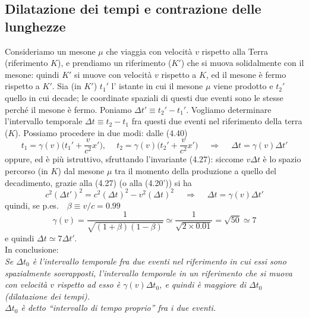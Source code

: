 \subsection{Dilatazione dei tempi e contrazione delle lunghezze}

Consideriamo un mesone $\mu$ che viaggia con velocit\`a $v$ rispetto alla Terra
(riferimento $K$), e prendiamo un riferimento ($K'$) che si muova solidalmente
con il mesone: quindi $K'$ si muove con velocit\`a $v$ rispetto a $K$, ed il
mesone \`e fermo rispetto a $K'$. Sia (in $K'$) $t_1'$ l' istante in cui il
mesone $\mu$ viene prodotto e $t_2'$ quello in cui decade; le coordinate
spaziali di questi due eventi sono le stesse perch\'e il mesone \`e fermo.
Poniamo $\Delta t'\equiv t_2'-t_1'$. Vogliamo determinare l'intervallo temporale
$\Delta t\equiv t_2-t_1$ fra questi due eventi nel riferimento della terra
($K$). Possiamo procedere in due modi: dalle (4.40)
\begin{equation}
  t_1=\gamma(v)\Big(t_1'+\frac{v}{c^2}x'\Big),
  \quad\ t_2=\gamma(v)\Big(t_2'+\frac{v}{c^2}x'\Big)
  \quad\ \Rightarrow\quad\ \Delta t=\gamma(v)\Delta t'
  \tag{4.42}
\end{equation}
oppure, ed \`e pi\`u istruttivo, sfruttando l'invariante (4.27): siccome
$v\Delta t$ \`e lo spazio percorso (in $K$) dal mesone $\mu$ tra il momento
della produzione a quello del decadimento, grazie alla (4.27) \big(o alla
(4.20')\big) si ha
\begin{equation}
  c^2(\Delta t')^2=c^2(\Delta t)^2-v^2(\Delta t)^2
  \quad\ \Rightarrow\quad\ \Delta t=\gamma(v)\Delta t'
  \tag{4.43}
\end{equation}
quindi, se p.es.\ \ $\beta\equiv v/c=0.99$
\begin{equation}
  \gamma(v)=\frac{1}{\sqrt{(1+\beta)(1-\beta)}}
  \simeq\frac{1}{\sqrt{2\times0.01}}=\sqrt{50}\simeq7
  \tag{4.44}
\end{equation}
e quindi $\Delta t\simeq7\Delta t'$.\\
In conclusione:\\
\textit{Se $\Delta t_0$ \`e l'intervallo temporale fra due eventi nel
riferimento in cui essi sono spazialmente sovrapposti, l'intervallo temporale in
un riferimento che si muova con velocit\`a $v$ rispetto ad esso \`e
$\gamma(v)\Delta t_0$, e quindi \`e maggiore di $\Delta t_0$ (dilatazione dei
tempi).\\
$\Delta t_0$ \`e detto ``intervallo di tempo proprio'' fra i due eventi.}

